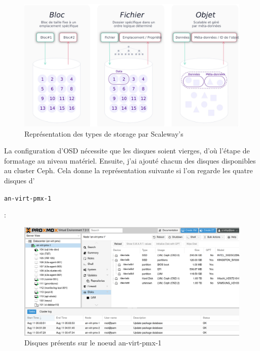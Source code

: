 \documentclass[12pt]{article}
\begin{document}
\begin{figure}[ht!]
    \centering
        \includegraphics[width=\textwidth]{src/graph_storage.jpeg}
    \caption{Représentation des types de storage par Scaleway's \cite{Scaleway}}
    \label{fig:storage_types}
\end{figure}

\newpage
La configuration d'\gls{OSD} nécessite que les disques soient vierges, d'où l'étape de formatage au niveau matériel.
Ensuite, j'ai ajouté chacun des disques disponibles au \gls{cluster} \gls{Ceph}.
Cela donne la représentation suivante si l'on regarde les quatre disques d'\begin{code}\texttt{an-virt-pmx-1}\end{code}:

\begin{figure}[ht!]
    \centering
        \includegraphics[width=\textwidth]{src/interface_proxmox_disk.png}
    \caption{Disques présents sur le noeud an-virt-pmx-1}
    \label{fig:disk_node1}
\end{figure}
\end{document}
